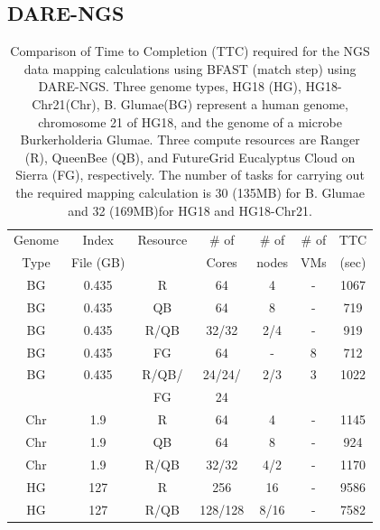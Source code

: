 \documentclass[]{svjour3}
\begin{document}

\subsection{DARE-NGS}


\begin{table}
\centering
\scriptsize
 \begin{tabular}{|c|c|c|c|c|c|c|} 
 \hline 
Genome & Index         & Resource    & \# of & \# of &   \# of         &	TTC  \\
  Type               & File (GB)        & &Cores &   nodes &  VMs&  (sec)\\  
  \hline
 BG &0.435& R&	64 &4&-	&1067 \\
\hline                  
BG &0.435& QB	&	64& 8&-	&719 \\
\hline
 BG &0.435&R/QB	&	32/32 &2/4& -&919 \\
\hline
 BG &0.435& FG &	64 &-&8	&712 \\
\hline
 BG &0.435 &  R/QB/ &	24/24/& 2/3 & 3 &1022\\
 & & FG& 24 &&&\\
\hline
\hline
Chr &1.9& R	&	64& 4 &-&1145 \\
\hline
Chr &1.9& QB	&	64&8&-	&924 \\
\hline
Chr &1.9& R/QB	&	32/32& 4/2&	-&1170 \\
\hline
\hline
HG &127& R	&	256 & 16 &-	&9586\\
\hline
HG &127& R/QB	&	128/128&8/16 & -&7582 \\
\hline
\end{tabular}
\caption{
  Comparison of Time to Completion (TTC) required for the NGS data
  mapping calculations using BFAST (match step) using DARE-NGS. 
  Three genome types,
  HG18 (HG), HG18-Chr21(Chr), B. Glumae(BG) represent a human genome,
  chromosome 21 of HG18, and the genome of a microbe Burkerholderia
  Glumae. Three compute resources are Ranger (R), QueenBee (QB), and
  FutureGrid  Eucalyptus Cloud on Sierra (FG), respectively. The
  number of tasks for carrying out the required mapping calculation is
  30 (135MB) for B. Glumae and 32 (169MB)for HG18 and HG18-Chr21.
}

  \label{table:NGS-Distributed} 
\end{table}
\end{document}
